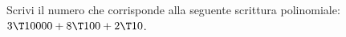\item Scrivi il numero che corrisponde alla seguente scrittura polinomiale: $3\T10000 + 8\T100 + 2\T10$. 